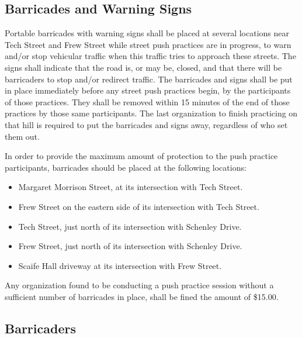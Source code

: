 \subsection{Barricades and Warning Signs}
\label{subsec:Freeroll Barricades}

	Portable barricades with warning signs shall be placed at several locations near Tech Street and Frew Street while street push practices are in progress, to warn and/or stop vehicular traffic when this traffic tries to approach these streets. The signs shall indicate that the road is, or may be, closed, and that there will be barricaders to stop and/or redirect traffic. The barricades and signs shall be put in place immediately before any street push practices begin, by the participants of those practices. They shall be removed within 15 minutes of the end of those practices by those same participants. The last organization to finish practicing on that hill is required to put the barricades and signs away, regardless of who set them out.

	In order to provide the maximum amount of protection to the push practice participants, barricades should be placed at the following locations:

	\begin{itemize}

		\item Margaret Morrison Street, at its intersection with Tech Street.

		\item Frew Street on the eastern side of its intersection with Tech Street.

		\item Tech Street, just north of its intersection with Schenley Drive.

		\item Frew Street, just north of its intersection with Schenley Drive.

		\item Scaife Hall driveway at its intersection with Frew Street.

	\end{itemize}

	Any organization found to be conducting a push practice session without a sufficient number of barricades in place, shall be fined the amount of \$15.00.

\subsection{Barricaders}

